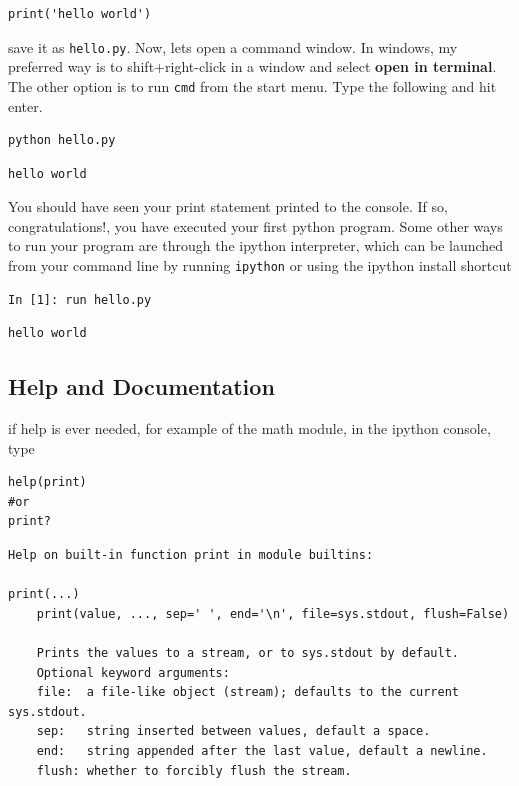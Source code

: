 \documentclass[%
oneside,                 %
final,                   %
10pt]{article}
\begin{document}
\begin{Verbatim}[numbers=none,fontsize=\fontsize{9pt}{9pt},baselinestretch=0.95,xleftmargin=2mm]
print('hello world')
\end{Verbatim}

save it as \texttt{hello.py}. Now, lets open a command window. In windows, my preferred way is to shift+right-click in a window and select \textbf{open in terminal}. The other option is to run \texttt{cmd} from the start menu. Type the following and hit enter.

\begin{Verbatim}[numbers=none,fontsize=\fontsize{9pt}{9pt},baselinestretch=0.95,xleftmargin=2mm]
python hello.py
\end{Verbatim}

\begin{Verbatim}[numbers=none,fontsize=\fontsize{9pt}{9pt},baselinestretch=0.95,xleftmargin=2mm]
hello world
\end{Verbatim}

You should have seen your print statement printed to the console. If so, congratulations!, you have executed your first python program. Some other ways to run your program are through the ipython interpreter, which can be launched from your command line by running \texttt{ipython} or using the ipython install shortcut

\begin{Verbatim}[numbers=none,fontsize=\fontsize{9pt}{9pt},baselinestretch=0.95,xleftmargin=2mm]
In [1]: run hello.py
\end{Verbatim}

\begin{Verbatim}[numbers=none,fontsize=\fontsize{9pt}{9pt},baselinestretch=0.95,xleftmargin=2mm]
hello world
\end{Verbatim}


\subsection{Help and Documentation}

if help is ever needed, for example of the math module, in the ipython console, type

\begin{Verbatim}[numbers=none,fontsize=\fontsize{9pt}{9pt},baselinestretch=0.95,xleftmargin=2mm]
help(print)
#or
print?
\end{Verbatim}

\begin{Verbatim}[numbers=none,fontsize=\fontsize{9pt}{9pt},baselinestretch=0.95,xleftmargin=2mm]
Help on built-in function print in module builtins:

print(...)
    print(value, ..., sep=' ', end='\n', file=sys.stdout, flush=False)

    Prints the values to a stream, or to sys.stdout by default.
    Optional keyword arguments:
    file:  a file-like object (stream); defaults to the current sys.stdout.
    sep:   string inserted between values, default a space.
    end:   string appended after the last value, default a newline.
    flush: whether to forcibly flush the stream.
\end{Verbatim}
\end{document}
